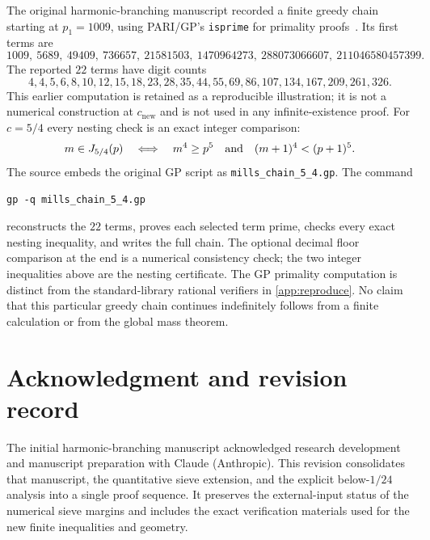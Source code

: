 The original harmonic-branching manuscript recorded a finite greedy
chain starting at $p_1=1009$, using PARI/GP's \texttt{isprime} for
primality proofs~\cite{PARI}. Its first terms are
\[
1009,\ 5689,\ 49409,\ 736657,\ 21581503,\ 1470964273,\
288073066607,\ 211046580457399.
\]
The reported $22$ terms have digit counts
\[
4,4,5,6,8,10,12,15,18,23,28,35,44,55,69,86,107,134,167,209,261,326.
\]
This earlier computation is retained as a reproducible illustration;
it is not a numerical construction at $c_{\mathrm{new}}$ and is not
used in any infinite-existence proof.
For $c=5/4$ every nesting check is an exact integer comparison:
\[
 m\in J_{5/4}(p)
 \quad\Longleftrightarrow\quad
 m^4\ge p^5\quad\hbox{and}\quad(m+1)^4<(p+1)^5.
\]
The source embeds the original GP script as
\texttt{mills\_chain\_5\_4.gp}. The command
\begin{verbatim}
gp -q mills_chain_5_4.gp
\end{verbatim}
reconstructs the $22$ terms,
proves each selected term prime, checks every exact nesting inequality,
and writes the full chain. The optional decimal floor comparison at
the end is a numerical consistency check; the two integer inequalities
above are the nesting certificate.
The GP primality computation is distinct from the standard-library
rational verifiers in \cref{app:reproduce}.
No claim that this particular greedy chain continues indefinitely
follows from a finite calculation or from the global mass theorem.

\section*{Acknowledgment and revision record}
The initial harmonic-branching manuscript acknowledged research
development and manuscript preparation with Claude (Anthropic).
This revision consolidates that manuscript, the quantitative sieve
extension, and the explicit below-$1/24$ analysis into a single proof
sequence. It preserves the external-input status of the numerical
sieve margins and includes the exact verification materials used for
the new finite inequalities and geometry.


